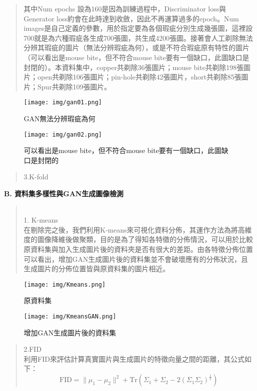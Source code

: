 \begin{flushleft}
\begin{abstract}
\begin{center}
    \end{center}
  \hspace{2em}
  其中Num epochs 設為160是因為訓練過程中，Discriminator loss與Generator loss約會在此時達到收斂，因此不再運算過多的epoch。Num images是自己定義的參數，用於指定要為各個瑕疵分別生成幾張圖，這裡設700就是為六種瑕疵各生成700張圖，共生成4200張圖。接著會人工剃除無法分辨其瑕疵的圖片（無法分辨瑕疵為何），或是不符合瑕疵原有特性的圖片（可以看出是mouse bite，但不符合mouse bite要有一個缺口，此圖缺口是封閉的）。本資料集中，copper共剃除36張圖片；mouse bite共剃除198張圖片；open共剃除106張圖片；pin-hole共剃除42張圖片，short共剃除85張圖片；Spur共剃除109張圖片。
  \end{abstract}
  \begin{figure}[H]
    \centering 
    \texttt{[image: img/gan01.png]} 
    \caption{GAN無法分辨瑕疵為何}
    \texttt{[image: img/gan02.png]}
    \caption{可以看出是mouse bite，但不符合mouse bite要有一個缺口，此圖缺口是封閉的}
  \end{figure}
  \begin{abstract}
    3.K-fold
  \end{abstract}
  {\fontsize{12}{0} \bf B. 資料集多樣性與GAN生成圖像檢測}
  \begin{abstract}
    \\1. K-means
    \\\hspace{2em}
    在剔除完之後，我們利用K-means來可視化資料分佈，其運作方法為將高維度的圖像降維後做聚類，目的是為了得知各特徵的分佈情況，可以用於比較原資料集與加入生成圖片後的資料夾是否有很大的差距。由各特徵分佈位置可以看出，增加GAN生成圖片後的資料集並不會破壞應有的分佈狀況，且生成圖片的分佈位置皆與原資料集的圖片相近。
  \end{abstract}
  \begin{figure}[H] 
    \centering
    \texttt{[image: img/Kmeans.png]} 
    \caption{原資料集}
    \texttt{[image: img/KmeansGAN.png]}
    \caption{增加GAN生成圖片後的資料集}
  \end{figure}
  \begin{abstract}
    2.FID
    \\\hspace{2em}
    利用FID來評估計算真實圖片與生成圖片的特徵向量之間的距離，其公式如下：
    \begin{equation}
      \text{FID} = \|\mu_1 - \mu_2\|^2 + \text{Tr}\left(\Sigma_1 + \Sigma_2 - 2\left(\Sigma_1 \Sigma_2\right)^{\frac{1}{2}}\right)

\end{equation}
\end{abstract}
\end{flushleft}
